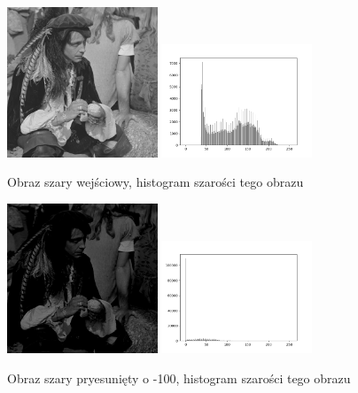 \documentclass[final,a4paper,openany,12pt]{mwbk}
\begin{document}
\begin{figure}[t]
	\begin{center}
		\includegraphics[width=0.4\textwidth]{pirate_gray}
		\includegraphics[width=0.4\textwidth]{pirate_gray_histogram}
	\end{center}
	\caption{Obraz szary wejściowy, histogram szarości tego obrazu}
\end{figure}

\begin{figure}[H]
	\begin{center}
		\includegraphics[width=0.4\textwidth]{pirate_gray_moveHist_result}
		\includegraphics[width=0.4\textwidth]{pirate_gray_moveHist_histogram}
	\end{center}
	\caption{Obraz szary pryesunięty o -100, histogram szarości tego obrazu}
\end{figure}
\end{document}
